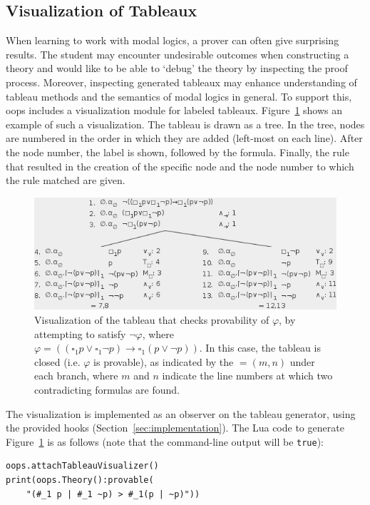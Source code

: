 \subsection{Visualization of Tableaux}

When learning to work with modal logics, a prover can often give surprising
results. The student may encounter undesirable outcomes when constructing a
theory and would like to be able to `debug' the theory by inspecting the proof
process. Moreover, inspecting generated tableaux may enhance understanding of
tableau methods and the semantics of modal logics in general.
To support this, oops includes a visualization module for labeled tableaux.
Figure~\ref{fig:tableauVis} shows an example of such a visualization. 
The tableau is drawn as a tree.
In the tree, nodes are numbered  in the order in which they are added
(left-most on each line).
After the node number, the
label is shown, followed by the formula. Finally, the rule that resulted in
the creation of the specific node and the node number to which the rule
matched are given.

\begin{figure}[p]
\centering
\includegraphics[scale=.55]{images/tableauVis}
\caption{Visualization of the tableau that checks provability of $\varphi$, by
attempting to satisfy $\neg \varphi$, where
$\varphi = ((\square_1 p \vee \square_1 \neg p) \to \square_1(p \vee \neg p))$.
In this case, the tableau is closed (i.e. $\varphi$ is provable), as indicated
by the $= (m, n)$ under each branch, where $m$ and $n$ indicate the line
numbers at which two contradicting formulas are found.}
\label{fig:tableauVis}
\end{figure}

The visualization is implemented as an observer on the tableau generator,
using the provided hooks (Section~\ref{sec:implementation}).
The Lua code to generate
Figure~\ref{fig:tableauVis} is as follows (note that the command-line output
will be \lstinline!true!):
\begin{lstlisting}
oops.attachTableauVisualizer()
print(oops.Theory():provable(
	"(#_1 p | #_1 ~p) > #_1(p | ~p)"))
\end{lstlisting}


